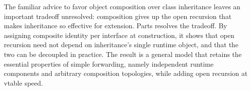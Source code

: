 \documentclass[acmsmall,nonacm]{acmart}
\theoremstyle{acmplain}
\begin{document}
The familiar advice to favor object composition over class inheritance leaves an important tradeoff unresolved: composition
gives up the open recursion that makes inheritance so effective for extension. Parts resolves the tradeoff. By assigning
composite identity per interface at construction, it shows that open recursion need not depend on inheritance's single runtime
object, and that the two can be decoupled in practice. The result is a general model that retains the essential properties
of simple forwarding, namely independent runtime components and arbitrary composition topologies, while adding open recursion
at vtable speed.

\end{document}
